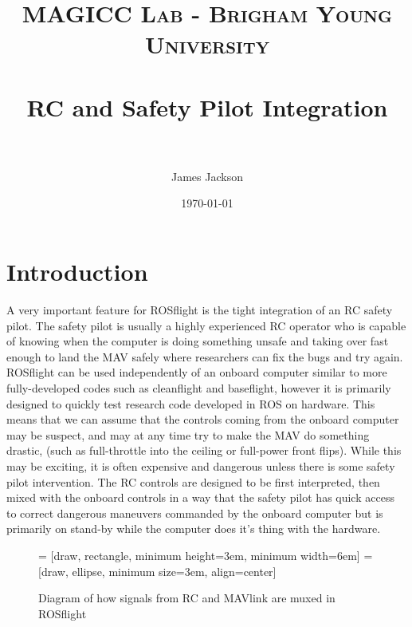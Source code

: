 \documentclass[paper=a4, fontsize=11pt]{scrartcl} %
\title{
\normalfont \normalsize
\textsc{MAGICC Lab - Brigham Young University} \\ [25pt] %
\horrule{0.5pt} \\[0.4cm] %
\huge RC and Safety Pilot Integration \\ %
\horrule{2pt} \\[0.5cm] %
}
\author{James Jackson} %
\date{\normalsize\today} %
\begin{document}
\maketitle %


\section{Introduction}

A very important feature for ROSflight is the tight integration of an RC safety pilot.  The safety pilot is usually a highly experienced RC operator who is capable of knowing when the computer is doing something unsafe and taking over fast enough to land the MAV safely where researchers can fix the bugs and try again.  ROSflight can be used independently of an onboard computer similar to more fully-developed codes such as cleanflight and baseflight, however it is primarily designed to quickly test research code developed in ROS on hardware.  This means that we can assume that the controls coming from the onboard computer may be suspect, and may at any time try to make the MAV do something drastic, (such as full-throttle into the ceiling or full-power front flips).  While this may be exciting, it is often expensive and dangerous unless there is some safety pilot intervention.  The RC controls are designed to be first interpreted, then mixed with the onboard controls in a way that the safety pilot has quick access to correct dangerous maneuvers commanded by the onboard computer but is primarily on stand-by while the computer does it's thing with the hardware.

\begin{figure}[h!]
	\centering

	 = [draw, rectangle, 
    					minimum height=3em, minimum width=6em]
  =[draw, ellipse, minimum size=3em,
    					align=center]

	\label{mux_configuration}
	\caption{Diagram of how signals from RC and MAVlink are muxed in ROSflight}
\end{figure}
\end{document}
